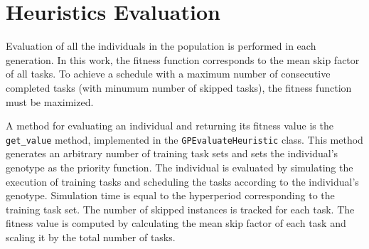 \section{Heuristics Evaluation}
\label{evaluation}
Evaluation of all the individuals in the population is performed in each generation.
In this work, the fitness function corresponds to the mean skip factor of all tasks.
To achieve a schedule with a maximum number of consecutive completed tasks (with minumum number of skipped tasks), the fitness function must be maximized.

A method for evaluating an individual and returning its fitness value is the \texttt{get\_value} method, implemented in the \texttt{GPEvaluateHeuristic} class.
This method generates an arbitrary number of training task sets and sets the individual's genotype as the priority function.
The individual is evaluated by simulating the execution of training tasks and scheduling the tasks according to the individual's genotype.
Simulation time is equal to the hyperperiod corresponding to the training task set.
The number of skipped instances is tracked for each task.
The fitness value is computed by calculating the mean skip factor of each task and scaling it by the total number of tasks.


